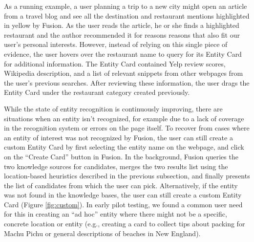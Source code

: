 As a running example, a user planning a trip to a new city might open an article from a travel blog and see all the destination and restaurant mentions highlighted in yellow by Fusion. As the user reads the article, he or she finds a highlighted restaurant and the author recommended it for reasons reasons that also fit our user's personal interests. However, instead of relying on this single piece of evidence, the user hovers over the restaurant name to query for its Entity Card for additional information. The Entity Card contained Yelp review scores, Wikipedia description, and a list of relevant snippets from other webpages from the user's previous searches. After reviewing these information, the user drags the Entity Card under the restaurant category created previously. 

While the state of entity recognition is continuously improving, there are situations when an entity isn't recognized, for example due to a lack of coverage in the recognition system or errors on the page itself. To recover from cases where an entity of interest was not recognized by Fusion, the user can still create a custom Entity Card by first selecting the entity name on the webpage, and click on the ``Create Card'' button in Fusion. In the background, Fusion queries the two knowledge sources for candidates, merges the two results list using the location-based heuristics described in the previous subsection, and finally presents the list of candidates from which the user can pick.  Alternatively, if the entity was not found in the knowledge bases, the user can still create a custom Entity Card (Figure \ref{fig:custom}). In early pilot testing, we found a common user need for this in creating an ``ad hoc'' entity where there might not be a specific, concrete location or entity (e.g., creating a card to collect tips about packing for Machu Pichu or general descriptions of beaches in New England). 

